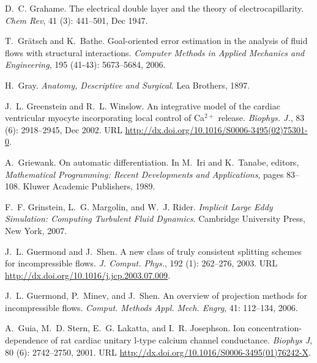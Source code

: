 \begin{thebibliography}{467}
D.~C. Grahame.
\newblock The electrical double layer and the theory of electrocapillarity.
\newblock \emph{Chem Rev}, 41 (3): 441--501, Dec 1947.

T.~Gr\"{a}tsch and K.~Bathe.
\newblock Goal-oriented error estimation in the analysis of fluid flows with
  structural interactions.
\newblock \emph{Computer Methods in Applied Mechanics and Engineering},
  195 (41-43): 5673--5684, 2006.

H.~Gray.
\newblock \emph{Anatomy, Descriptive and Surgical}.
\newblock Lea Brothers, 1897.

J.~L. Greenstein and R.~L. Winslow.
\newblock An integrative model of the cardiac ventricular myocyte incorporating
  local control of {C}a$^{2+}$ release.
\newblock \emph{Biophys. J.}, 83 (6): 2918--2945, Dec 2002.
\newblock URL \url{http://dx.doi.org/10.1016/S0006-3495(02)75301-0}.

A.~Griewank.
\newblock On automatic differentiation.
\newblock In M.~Iri and K.~Tanabe, editors, \emph{Mathematical Programming:
  Recent Developments and Applications}, pages 83--108. Kluwer Academic
  Publishers, 1989.

F.~F. Grinstein, L.~G. Margolin, and W.~J. Rider.
\newblock \emph{Implicit Large Eddy Simulation: Computing Turbulent Fluid
  Dynamics}.
\newblock Cambridge University Press, New York, 2007.

J.~L. Guermond and J.~Shen.
\newblock A new class of truly consistent splitting schemes for incompressible
  flows.
\newblock \emph{J. Comput. Phys.}, 192 (1): 262--276, 2003.
\newblock URL \url{http://dx.doi.org/10.1016/j.jcp.2003.07.009}.

J.~L. Guermond, P.~Minev, and J.~Shen.
\newblock An overview of projection methods for incompressible flows.
\newblock \emph{Comput. Methods Appl. Mech. Engrg}, 41: 112--134,
  2006.

A.~Guia, M.~D. Stern, E.~G. Lakatta, and I.~R. Josephson.
\newblock Ion concentration-dependence of rat cardiac unitary l-type calcium
  channel conductance.
\newblock \emph{Biophys J}, 80 (6): 2742--2750, 2001.
\newblock URL \url{http://dx.doi.org/10.1016/S0006-3495(01)76242-X}.


\end{thebibliography}

